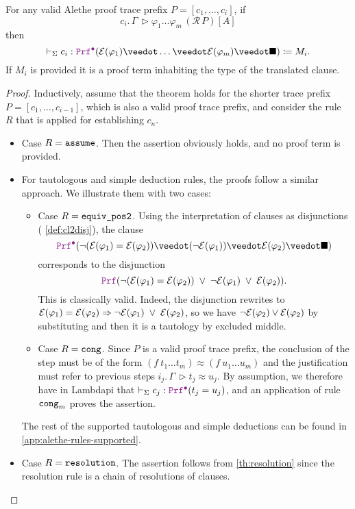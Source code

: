\begin{theorem}\label{theorem:soundness}
  For any valid Alethe proof trace prefix $P = [c_1, \dots, c_i]$, if
  \[
    c_i.\,\Gamma\, \triangleright \varphi_1 \dots \varphi_m \, (\mathcal{R}\,P)[A]
  \]
  then
  \[
    \vdash_\Sigma c_i : \pid (\E{\varphi_1} \veedot \dots  \veedot \E{\varphi_m} \veedot \nil) \coloneq M_i.
  \] If $M_i$ is provided it is a proof term inhabiting the type of the translated clause.
\end{theorem}
\begin{proof}
  Inductively, assume that the theorem holds for the shorter trace prefix $P = [c_1, \dots, c_{i-1}]$, which is also a valid proof trace prefix, and consider the rule $R$ that is applied for establishing $c_n$.
  \begin{itemize}
  \item Case $R = \texttt{\upshape{assume}}$. Then the assertion obviously holds, and no proof term is provided.
  \item For tautologous and simple deduction rules, the proofs follow a similar approach. We illustrate them with two cases:
  \begin{itemize}
  \item Case $R = \texttt{\upshape{equiv\_pos2}}$.
    Using the interpretation of clauses as disjunctions ( \cref{def:cl2disj}), the clause
    \[
       \prfcl (\neg(\E{\varphi_1} = \E{\varphi_2}) \veedot (\neg \E{\varphi_1}) \veedot \E{\varphi_2} \veedot \nil)
    \]
    corresponds to the disjunction
    \[
      \prf (\neg(\E{\varphi_1} = \E{\varphi_2}) \;\lor\; \neg \E{\varphi_1} \;\lor\; \E{\varphi_2}).
    \]
    This is classically valid.
    Indeed, the disjunction rewrites to  $\mathcal{E}(\varphi_1) = \mathcal{E}(\varphi_2) \Rightarrow \neg \mathcal{E}(\varphi_1) \;\lor\; \mathcal{E}(\varphi_2)$, so we have $\neg \mathcal{E}(\varphi_2) \lor \mathcal{E}(\varphi_2)$ by substituting and then it is a tautology by excluded middle.
  \item Case $R = \texttt{\upshape{cong}}$. Since $P$ is a valid proof trace prefix, the conclusion of the step must be of the form $(f~t_1 \ldots t_m) \approx (f~u_1 \ldots u_m)$ and the justification must refer to previous steps $i_j.\,\Gamma\,\triangleright t_j \approx u_j$.
  By assumption, we therefore have in Lambdapi that $\vdash_{\Sigma} c_j: \pid (t_j = u_j)$, and an application of rule $\texttt{\upshape{cong}}_m$ proves the assertion.
  \end{itemize}
  The rest of the supported tautologous and simple deductions can be found in \cref{app:alethe-rules-supported}.
  \item Case $R = \texttt{\upshape{resolution}}$. The assertion follows from \cref{th:resolution} since the resolution rule is a chain of resolutions of clauses.

\end{itemize}
\end{proof}
